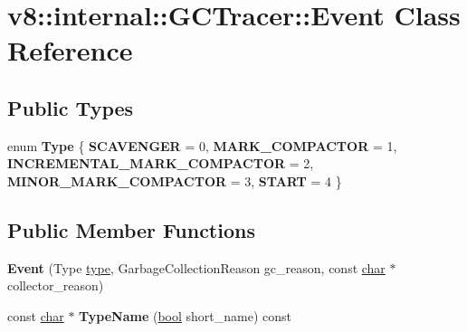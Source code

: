 \hypertarget{classv8_1_1internal_1_1GCTracer_1_1Event}{}\section{v8\+:\+:internal\+:\+:G\+C\+Tracer\+:\+:Event Class Reference}
\label{classv8_1_1internal_1_1GCTracer_1_1Event}
\subsection*{Public Types}
\begin{DoxyCompactItemize}
\item 
\mbox{\label{classv8_1_1internal_1_1GCTracer_1_1Event_a0f3b1f2a3d83c7041662d371f94ac3f4}} 
enum {\bfseries Type} \{ \newline
{\bfseries S\+C\+A\+V\+E\+N\+G\+ER} = 0, 
{\bfseries M\+A\+R\+K\+\_\+\+C\+O\+M\+P\+A\+C\+T\+OR} = 1, 
{\bfseries I\+N\+C\+R\+E\+M\+E\+N\+T\+A\+L\+\_\+\+M\+A\+R\+K\+\_\+\+C\+O\+M\+P\+A\+C\+T\+OR} = 2, 
{\bfseries M\+I\+N\+O\+R\+\_\+\+M\+A\+R\+K\+\_\+\+C\+O\+M\+P\+A\+C\+T\+OR} = 3, 
\newline
{\bfseries S\+T\+A\+RT} = 4
 \}
\end{DoxyCompactItemize}
\subsection*{Public Member Functions}
\begin{DoxyCompactItemize}
\item 
\mbox{\label{classv8_1_1internal_1_1GCTracer_1_1Event_a0786cd925c252654e420e5d8427624b4}} 
{\bfseries Event} (Type \mbox{\hyperlink{classstd_1_1conditional_1_1type}{type}}, Garbage\+Collection\+Reason gc\+\_\+reason, const \mbox{\hyperlink{classchar}{char}} $\ast$collector\+\_\+reason)
\item 
\mbox{\label{classv8_1_1internal_1_1GCTracer_1_1Event_a8eeaac81a52ff809e520a1f8441b8041}} 
const \mbox{\hyperlink{classchar}{char}} $\ast$ {\bfseries Type\+Name} (\mbox{\hyperlink{classbool}{bool}} short\+\_\+name) const
\end{DoxyCompactItemize}
